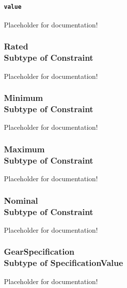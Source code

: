 \paragraph{\texttt{value}}\mbox{}
\newline\tab Placeholder for documentation!
\FloatBarrier
\subsubsection[Rated]{Rated \\ {\small Subtype of Constraint}}
  \label{type:Rated}

\FloatBarrier

Placeholder for documentation!

\FloatBarrier
\subsubsection[Minimum]{Minimum \\ {\small Subtype of Constraint}}
  \label{type:Minimum}

\FloatBarrier

Placeholder for documentation!

\FloatBarrier
\subsubsection[Maximum]{Maximum \\ {\small Subtype of Constraint}}
  \label{type:Maximum}

\FloatBarrier

Placeholder for documentation!

\FloatBarrier
\subsubsection[Nominal]{Nominal \\ {\small Subtype of Constraint}}
  \label{type:Nominal}

\FloatBarrier

Placeholder for documentation!

\FloatBarrier
\subsubsection[GearSpecification]{GearSpecification \\ {\small Subtype of SpecificationValue}}
  \label{type:GearSpecification}

\FloatBarrier

Placeholder for documentation!

